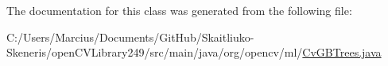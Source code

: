 The documentation for this class was generated from the following file\+:\begin{DoxyCompactItemize}
\item 
C\+:/\+Users/\+Marcius/\+Documents/\+Git\+Hub/\+Skaitliuko-\/\+Skeneris/open\+C\+V\+Library249/src/main/java/org/opencv/ml/\mbox{\hyperlink{_cv_g_b_trees_8java}{Cv\+G\+B\+Trees.\+java}}\end{DoxyCompactItemize}
